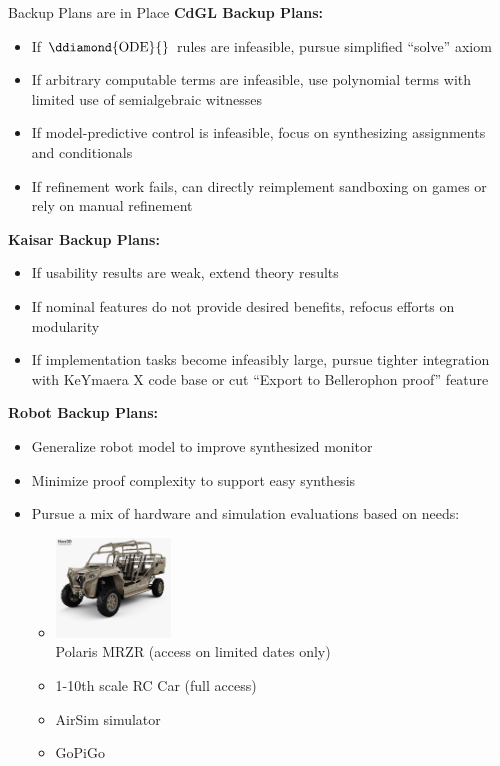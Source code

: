 \documentclass[slidestop,aspectratio=169]{beamer}
\providecommand{\KeYmaeraX}{KeYmaera X\xspace}
\theoremstyle{plain}
\theoremstyle{definition}
\theoremstyle{remark}
\begin{document}
\begin{frame}[t,allowframebreaks]{Backup Plans are in Place}
\textbf{CdGL Backup Plans:}
\begin{itemize}
\item If $\ddiamond{\text{ODE}}{}$ rules are infeasible, pursue simplified ``solve'' axiom
\item If arbitrary computable terms are infeasible, use polynomial terms with limited use of semialgebraic witnesses
\item If model-predictive control is infeasible, focus on synthesizing assignments and conditionals
\item If refinement work fails, can directly reimplement sandboxing on games or rely on manual refinement
\end{itemize}
\framebreak
\textbf{Kaisar Backup Plans:}
\begin{itemize}
\item If usability results are weak, extend theory results
\item If nominal features do not provide desired benefits, refocus efforts on modularity
\item If implementation tasks become infeasibly large, pursue tighter integration with \KeYmaeraX code base or cut ``Export to Bellerophon proof'' feature
\end{itemize}
\framebreak

{\textbf{Robot Backup Plans:}
\begin{itemize}
\item Generalize robot model to improve synthesized monitor
\item Minimize proof complexity to support easy synthesis
\item Pursue a mix of hardware and simulation evaluations based on needs:
\begin{itemize}
\item\includegraphics[width=1.2in]{img/mrzr.jpg}\\
Polaris MRZR (access on limited dates only)
\item 1-10th scale RC Car (full access)
\item AirSim simulator
\item GoPiGo
\end{itemize}
\end{itemize}}
\end{frame}
\end{document}
